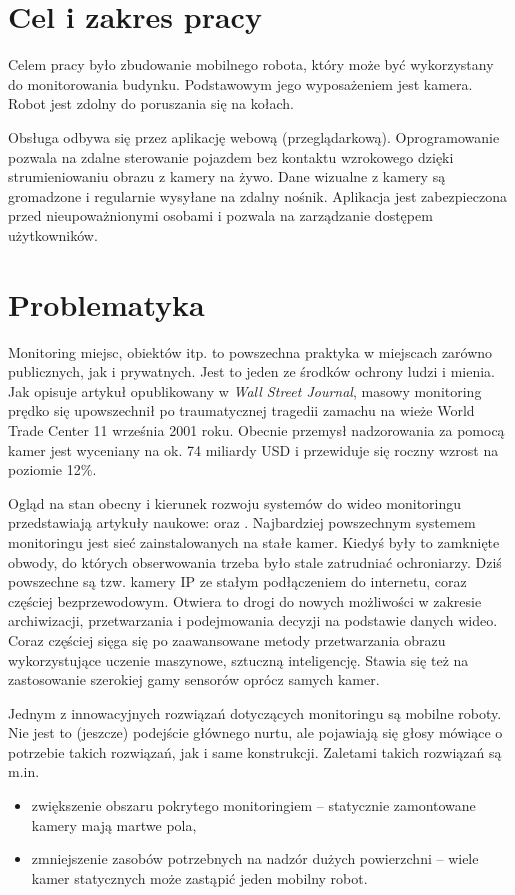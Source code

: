 \section{Cel i zakres pracy}
Celem pracy było zbudowanie mobilnego robota, który może być wykorzystany do monitorowania budynku.
Podstawowym jego wyposażeniem jest kamera.
Robot jest zdolny do poruszania się na kołach.

Obsługa odbywa się przez aplikację webową (przeglądarkową).
Oprogramowanie pozwala na zdalne sterowanie pojazdem bez kontaktu wzrokowego dzięki strumieniowaniu obrazu z kamery na żywo.
Dane wizualne z kamery są gromadzone i regularnie wysyłane na zdalny nośnik.
Aplikacja jest zabezpieczona przed nieupoważnionymi osobami i pozwala na zarządzanie dostępem użytkowników.

\section{Problematyka}
Monitoring miejsc, obiektów itp. to powszechna praktyka w miejscach zarówno publicznych, jak i prywatnych.
Jest to jeden ze środków ochrony ludzi i mienia.
Jak opisuje artykuł\cite{surveillance_911} opublikowany w \textit{Wall Street Journal}, masowy monitoring prędko się upowszechnił po traumatycznej tragedii zamachu na wieże World Trade Center 11 września 2001 roku.
Obecnie przemysł nadzorowania za pomocą kamer jest wyceniany na ok. 74 miliardy USD\cite{rynek_monitoring} i przewiduje się roczny wzrost na poziomie 12\%.

Ogląd na stan obecny i kierunek rozwoju systemów do wideo monitoringu przedstawiają artykuły naukowe: \cite{surv_review_1} oraz \cite{surv_review_2}.
Najbardziej powszechnym systemem monitoringu jest sieć zainstalowanych na stałe kamer.
Kiedyś były to zamknięte obwody, do których obserwowania trzeba było stale zatrudniać ochroniarzy.
Dziś powszechne są tzw. kamery IP ze stałym podłączeniem do internetu, coraz częściej bezprzewodowym.
Otwiera to drogi do nowych możliwości w zakresie archiwizacji, przetwarzania i podejmowania decyzji na podstawie danych wideo.
Coraz częściej sięga się po zaawansowane metody przetwarzania obrazu wykorzystujące uczenie maszynowe, sztuczną inteligencję.
Stawia się też na zastosowanie szerokiej gamy sensorów oprócz samych kamer.

Jednym z innowacyjnych rozwiązań dotyczących monitoringu są mobilne roboty.
Nie jest to (jeszcze) podejście głównego nurtu, ale pojawiają się głosy mówiące o potrzebie takich rozwiązań, jak i same konstrukcji.
Zaletami takich rozwiązań są m.in.
\begin{itemize}
    \item zwiększenie obszaru pokrytego monitoringiem -- statycznie zamontowane kamery mają martwe pola,
    \item zmniejszenie zasobów potrzebnych na nadzór dużych powierzchni -- wiele kamer statycznych może zastąpić jeden mobilny robot.
\end{itemize}

